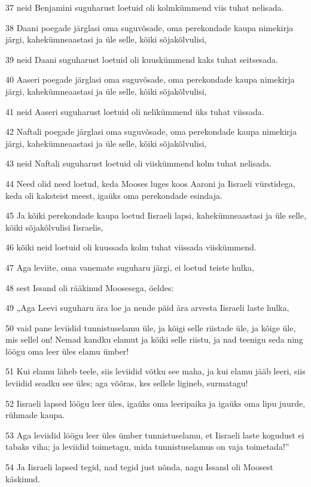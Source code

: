 \par 37 neid Benjamini suguharust loetuid oli kolmkümmend viis tuhat nelisada.
\par 38 Daani poegade järglasi oma suguvõsade, oma perekondade kaupa nimekirja järgi, kahekümneaastasi ja üle selle, kõiki sõjakõlvulisi,
\par 39 neid Daani suguharust loetuid oli kuuskümmend kaks tuhat seitsesada.
\par 40 Aaseri poegade järglasi oma suguvõsade, oma perekondade kaupa nimekirja järgi, kahekümneaastasi ja üle selle, kõiki sõjakõlvulisi,
\par 41 neid Aaseri suguharust loetuid oli nelikümmend üks tuhat viissada.
\par 42 Naftali poegade järglasi oma suguvõsade, oma perekondade kaupa nimekirja järgi, kahekümneaastasi ja üle selle, kõiki sõjakõlvulisi,
\par 43 neid Naftali suguharust loetuid oli viiskümmend kolm tuhat nelisada.
\par 44 Need olid need loetud, keda Mooses luges koos Aaroni ja Iisraeli vürstidega, keda oli kaksteist meest, igaüks oma perekondade esindaja.
\par 45 Ja kõiki perekondade kaupa loetud Iisraeli lapsi, kahekümneaastasi ja üle selle, kõiki sõjakõlvulisi Iisraelis,
\par 46 kõiki neid loetuid oli kuussada kolm tuhat viissada viiskümmend.
\par 47 Aga leviite, oma vanemate suguharu järgi, ei loetud teiste hulka,
\par 48 sest Issand oli rääkinud Moosesega, öeldes:
\par 49 „Aga Leevi suguharu ära loe ja nende päid ära arvesta Iisraeli laste hulka,
\par 50 vaid pane leviidid tunnistuselamu üle, ja kõigi selle riistade üle, ja kõige üle, mis sellel on! Nemad kandku elamut ja kõiki selle riistu, ja nad teenigu seda ning löögu oma leer üles elamu ümber!
\par 51 Kui elamu läheb teele, siis leviidid võtku see maha, ja kui elamu jääb leeri, siis leviidid seadku see üles; aga võõras, kes sellele ligineb, surmatagu!
\par 52 Iisraeli lapsed löögu leer üles, igaüks oma leeripaika ja igaüks oma lipu juurde, rühmade kaupa.
\par 53 Aga leviidid löögu leer üles ümber tunnistuselamu, et Iisraeli laste kogudust ei tabaks viha; ja leviidid toimetagu, mida tunnistuselamus on vaja toimetada!”
\par 54 Ja Iisraeli lapsed tegid, nad tegid just nõnda, nagu Issand oli Moosest käskinud.

